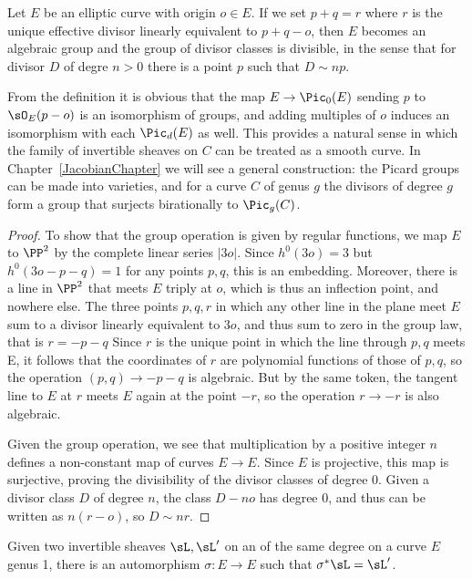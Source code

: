 \begin{proposition}\label{group law} Let $E$ be an elliptic curve with origin $o\in E$.
If we set $p+q = r$ where $r$ is the unique effective divisor linearly equivalent to $p+q-o$, then $E$ becomes an algebraic group
and the group of divisor classes is divisible, in the sense that for divisor $D$ of degre $n>0$
 there is a point $p$ such that $D\sim np$.
 \end{proposition}

\begin{remark}
From the definition it is obvious that 
the map
$E \to \Pic_0(E)$ sending $p$ to $\sO_E(p-o)$ is an isomorphism of groups, and adding multiples of $o$
induces an isomorphism with each $\Pic_d(E)$ as well. This provides a natural sense
in which the family of invertible sheaves on $C$ can be treated as a smooth curve.
 In Chapter~\ref{JacobianChapter} we will see a general construction: the Picard groups can be made into
varieties, and for a curve $C$ of genus $g$ the divisors
of degree $g$ form a group that surjects birationally to $\Pic_g(C)$. 
\end{remark}
 
\begin{proof}
To show that the group operation is given by regular functions, we map $E$ to $\PP^2$ by the complete linear series $|3o|$. Since
$h^0(3o) = 3$ but $h^0(3o-p-q) = 1$ for any points $p,q$, this is an embedding. Moreover, there is a line in $\PP^2$ that meets
$E$ triply at $o$, which is thus an inflection point, and nowhere else. The three points $p,q,r$ in which any other line in the plane
meet $E$ sum to a divisor linearly equivalent to $3o$, and thus sum to zero in the group law, that is $r = -p-q$ Since $r$ is the unique
point in which the line
through $p,q$ meets  E, it follows that the coordinates of $r$ are polynomial functions of those of $p,q$, so the operation
$(p,q) \to -p-q$ is algebraic. But by the same token, the tangent line to $E$ at $r$ meets $E$ again at the point $-r$,
so the operation $r\to -r$ is also algebraic.

Given the group operation, we see that multiplication by a positive integer $n$ defines a non-constant map of 
curves $E\to E$. Since $E$ is projective, this map is surjective, proving the divisibility of the divisor classes of degree 0. 
Given a divisor class $D$ of degree $n$, the class $D -no$ has degree 0, and thus can be written as $n(r-o)$, so
$D\sim nr$.
\end{proof}

\begin{corollary}\label{equivalence of sheaves}
Given two invertible sheaves $\sL, \sL'$ on an of the same degree on a curve $E$ genus 1, there is an automorphism $\sigma: E\to E$
such that $\sigma^*\sL = \sL'$.
\end{corollary}

